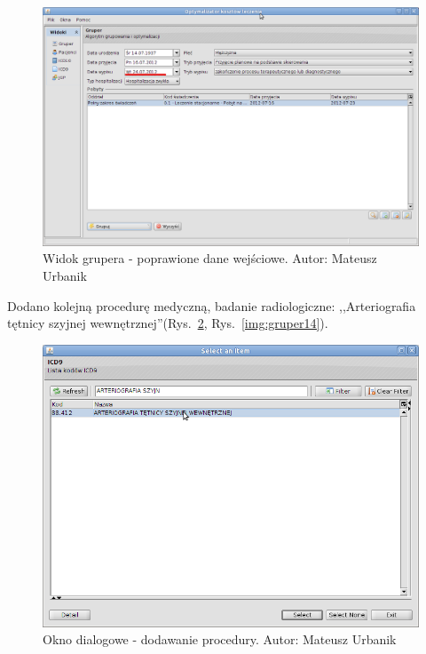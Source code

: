 \begin{figure}%
\centering
\includegraphics[scale=0.4]{images/gruper12}
\caption[Widok grupera]{Widok grupera - poprawione dane wejściowe. Autor: Mateusz Urbanik}
\label{img:gruper12}
\end{figure}

Dodano kolejną procedurę medyczną, badanie radiologiczne: ,,Arteriografia tętnicy szyjnej wewnętrznej''(Rys.~\ref{img:gruper13}, Rys.~\ref{img:gruper14}).

\begin{figure}%
\centering
\includegraphics[scale=0.4]{images/gruper13}
\caption[Widok grupera]{Okno dialogowe - dodawanie procedury. Autor: Mateusz Urbanik}
\label{img:gruper13}
\end{figure}


